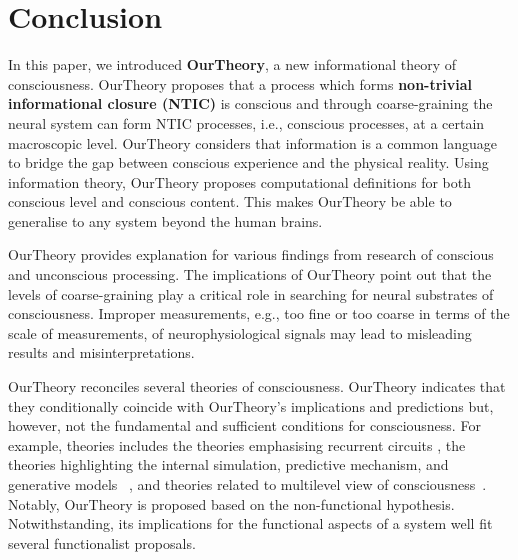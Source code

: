 \documentclass[utf8]{article}
\begin{document}
    \section{Conclusion}
    In this paper, we introduced \textbf{\acf{OurTheory}}, a new informational theory of consciousness. \ac{OurTheory} proposes that a process which forms \textbf{non-trivial informational closure (NTIC)} is conscious and through coarse-graining the neural system can form NTIC processes, i.e., conscious processes, at a certain macroscopic level. \ac{OurTheory} considers that information is a common language to bridge the gap between conscious experience and the physical reality. Using information theory, \ac{OurTheory} proposes computational definitions for both conscious level and conscious content. This makes \ac{OurTheory} be able to generalise to any system beyond the human brains. 
    
    \ac{OurTheory} provides explanation for various findings from research of conscious and unconscious processing. The implications of \ac{OurTheory} point out that the levels of coarse-graining play a critical role in searching for neural substrates of consciousness. Improper measurements, e.g., too fine or too coarse in terms of the scale of measurements, of neurophysiological signals may lead to misleading results and misinterpretations. 
    
    
    \ac{OurTheory} reconciles several theories of consciousness. \ac{OurTheory} indicates that they conditionally coincide with \ac{OurTheory}'s implications and predictions but, however, not the fundamental and sufficient conditions for consciousness. For example, theories includes the theories emphasising recurrent circuits \citep{lamme2006towards, edelman1992bright}, the theories highlighting the internal simulation,  predictive mechanism, and generative models ~\citep{revonsuo2006inner, clark_2013,Hohwy2013, kanai_chang_yu_de_abril_biehl_guttenberg_2019, seth2014predictive, seth2015presence}, and theories related to multilevel view of consciousness~\citep{pennartz2018consciousness,pennartz2015brain,prinz2007intermediate, jackendoff1987consciousness}. Notably, \ac{OurTheory} is proposed based on the non-functional hypothesis. Notwithstanding, its implications for the functional aspects of a system well fit several functionalist proposals.
	
\end{document}
